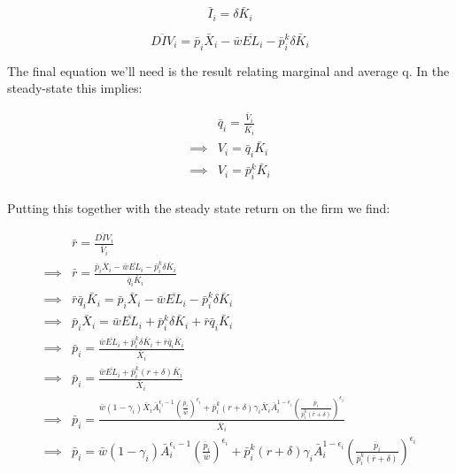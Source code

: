 \documentclass[letterpaper,12pt]{article}
\theoremstyle{definition}
\begin{document}
\begin{spacing}{1.5}
\begin{equation}
\label{eqn:i_ss2}
\bar{I}_{i} = \delta \bar{K}_{i}
\end{equation}

\begin{equation}
\label{eqn:div_ss}
\overline{DIV}_{i} = \bar{p}_{i}\bar{X}_{i}-\bar{w}\overline{EL}_{i}-\bar{p}^{k}_{i}\delta \bar{K}_{i}
\end{equation}

The final equation we'll need is the \citet{Hayashi1982} result relating marginal and average q.  In the steady-state this implies:

\begin{equation}
\label{eqn:ss_marg_avg_q}
\begin{split}
& \bar{q}_{i} = \frac{\bar{V}_{i}}{\bar{K}_{i}} \\
\implies & V_{i} = \bar{q}_{i}\bar{K}_{i} \\
\implies & V_{i} = \bar{p}^{k}_{i}\bar{K}_{i}  \\
\end{split}
\end{equation}

Putting this together with the steady state return on the firm we find:

\begin{equation}
\label{eqn:price_det_ss}
\begin{split}
&\bar{r} = \frac{\overline{DIV}_{i}}{\bar{V}_{i}} \\
\implies & \bar{r} = \frac{ \bar{p}_{i}\bar{X}_{i}-\bar{w}\overline{EL}_{i}-\bar{p}^{k}_{i}\delta \bar{K}_{i}}{\bar{q}_{i}\bar{K}_{i}} \\
\implies & \bar{r}\bar{q}_{i}\bar{K}_{i} = \bar{p}_{i}\bar{X}_{i}-\bar{w}\overline{EL}_{i}-\bar{p}^{k}_{i}\delta \bar{K}_{i} \\
\implies &  \bar{p}_{i}\bar{X}_{i} = \bar{w}\overline{EL}_{i} + \bar{p}^{k}_{i}\delta \bar{K}_{i} +  \bar{r}\bar{q}_{i}\bar{K}_{i} \\
\implies &   \bar{p}_{i} = \frac{\bar{w}\overline{EL}_{i} + \bar{p}^{k}_{i}\delta \bar{K}_{i} +  \bar{r}\bar{q}_{i}\bar{K}_{i}}{\bar{X}_{i}}\\
\implies &   \bar{p}_{i} = \frac{\bar{w}\overline{EL}_{i} + \bar{p}^{k}_{i}(r+\delta) \bar{K}_{i}}{\bar{X}_{i}}\\
\implies &\bar{p}_{i} = \frac{ \bar{w}(1-\gamma_{i})\bar{X}_{i}\bar{A}_{i}^{\epsilon_{i}-1}\left( \frac{ \bar{p}_{i}}{\bar{w}}\right)^{\epsilon_{i}}+\bar{p}^{k}_{i}(r+\delta)\gamma_{i}\bar{X}_{i}\bar{A}_{i}^{1-\epsilon_{i}} \left(\frac{\bar{p}_{i}}{\bar{p}^{k}_{i}(\bar{r}+\delta)} \right)^{\epsilon_{i}}}{\bar{X}_{i}} \\
\implies &\bar{p}_{i} = \bar{w}(1-\gamma_{i})\bar{A}_{i}^{\epsilon_{i}-1}\left( \frac{ \bar{p}_{i}}{\bar{w}}\right)^{\epsilon_{i}}+\bar{p}^{k}_{i}(r+\delta)\gamma_{i}\bar{A}_{i}^{1-\epsilon_{i}} \left(\frac{\bar{p}_{i}}{\bar{p}^{k}_{i}(\bar{r}+\delta)} \right)^{\epsilon_{i}}\\
\end{split}
\end{equation}


\end{spacing}
\end{document}
